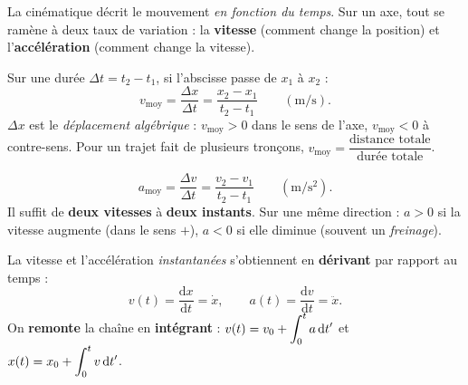 \documentclass[11pt,a4paper]{article}
\begin{document}

\noindent La cinématique décrit le mouvement \emph{en fonction du temps}. Sur un axe, tout se
ramène à deux \og taux de variation\fg{} : la \textbf{vitesse} (comment change la position) et
l'\textbf{accélération} (comment change la vitesse).

\begin{cle}
Sur une durée $\Delta t=t_2-t_1$, si l'abscisse passe de $x_1$ à $x_2$ :
\[ v_{\text{moy}}=\frac{\Delta x}{\Delta t}=\frac{x_2-x_1}{t_2-t_1}\qquad(\si{\metre\per\second}). \]
$\Delta x$ est le \emph{déplacement algébrique} : $v_{\text{moy}}>0$ dans le sens de l'axe,
$v_{\text{moy}}<0$ à contre-sens. Pour un trajet fait de plusieurs tronçons,
$v_{\text{moy}}=\dfrac{\text{distance totale}}{\text{durée totale}}$.
\end{cle}

\begin{cle}
\[ a_{\text{moy}}=\frac{\Delta v}{\Delta t}=\frac{v_2-v_1}{t_2-t_1}\qquad(\si{\metre\per\second\squared}). \]
Il suffit de \textbf{deux vitesses} à \textbf{deux instants}. Sur une même direction : $a>0$ si la
vitesse augmente (dans le sens $+$), $a<0$ si elle diminue (souvent un \emph{freinage}).
\end{cle}

\begin{methode}
La vitesse et l'accélération \emph{instantanées} s'obtiennent en \textbf{dérivant} par rapport au temps :
\[ v(t)=\frac{\mathrm{d}x}{\mathrm{d}t}=\dot x,\qquad a(t)=\frac{\mathrm{d}v}{\mathrm{d}t}=\ddot x. \]
On \textbf{remonte} la chaîne en \textbf{intégrant} : $\displaystyle v(t)=v_0+\int_0^t a\,\mathrm{d}t'$ et
$\displaystyle x(t)=x_0+\int_0^t v\,\mathrm{d}t'$.
\begin{center}
\end{center}
\end{methode}
\end{document}
